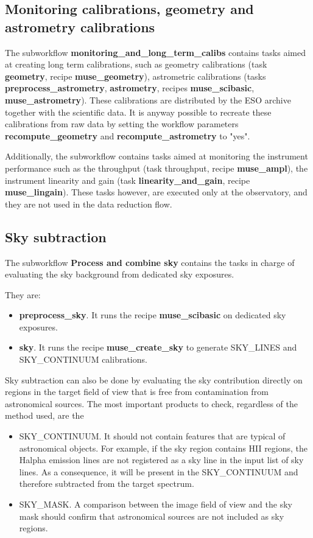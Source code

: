\subsection{Monitoring calibrations, geometry and astrometry calibrations}

The subworkflow {\bf monitoring\_and\_long\_term\_calibs} contains
tasks aimed at creating long term calibrations, such as geometry
calibrations (task {\bf geometry}, recipe {\bf muse\_geometry}),
astrometric calibrations (tasks {\bf preprocess\_astrometry}, {\bf
  astrometry}, recipes {\bf muse\_scibasic}, {\bf
  muse\_astrometry}). These calibrations are distributed by the ESO
archive together with the scientific data. It is anyway possible to
recreate these calibrations from raw data by setting the workflow
parameters {\bf recompute\_geometry} and {\bf recompute\_astrometry}
to "yes".

Additionally, the subworkflow contains tasks aimed at monitoring the
instrument performance such as the throughput (task throughput, recipe
{\bf muse\_ampl}), the instrument linearity and gain (task {\bf
  linearity\_and\_gain}, recipe {\bf muse\_lingain}). These tasks
however, are executed only at the observatory, and they are not used
in the data reduction flow.

\subsection{Sky subtraction}

The subworkflow {\bf Process and combine sky} contains the tasks in charge of evaluating the sky background from dedicated
sky exposures.

They are:
\begin{itemize}
\item {\bf preprocess\_sky}. It runs the recipe {\bf muse\_scibasic} on dedicated sky exposures.
\item {\bf sky}. It runs the recipe {\bf muse\_create\_sky} to generate SKY\_LINES and SKY\_CONTINUUM calibrations.
\end{itemize}

Sky subtraction can also be done by evaluating the sky contribution
directly on regions in the target field of view that is free from
contamination from astronomical sources.  The most important products
to check, regardless of the method used, are the

\begin{itemize}
\item SKY\_CONTINUUM. It should not contain features that are typical of astronomical objects. 
For example, if the sky region contains HII regions, the Halpha emission lines are not registered as a sky line in the 
input list of sky lines. As a consequence, it will be present in the SKY\_CONTINUUM and therefore subtracted from the 
target spectrum.
\item SKY\_MASK. A comparison between the image field of view and the sky mask should confirm that astronomical sources are not included as sky regions.

\end{itemize}

